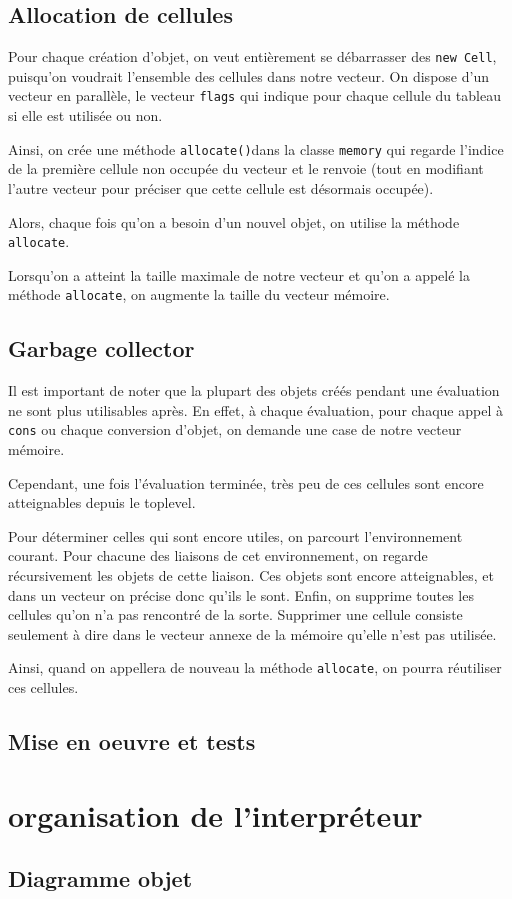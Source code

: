 \documentclass[12pt]{article}
\def\code #1{\lstinline{#1}}
\begin{document}
\subsection{Allocation de cellules}

Pour chaque création d'objet, on veut entièrement se débarrasser des \code{new Cell}, puisqu'on voudrait l'ensemble des cellules dans notre vecteur.  On dispose  d'un vecteur en parallèle, le vecteur \code{flags} qui indique pour chaque cellule du tableau si elle est utilisée ou non.

Ainsi, on crée une méthode \code{allocate()}dans la classe \code{memory} qui regarde l'indice de la première cellule non occupée du vecteur et le renvoie (tout en modifiant l'autre vecteur pour préciser que cette cellule est désormais occupée).

Alors, chaque fois qu'on a besoin d'un nouvel objet, on utilise la méthode \code{allocate}.

Lorsqu'on a atteint la taille maximale de notre vecteur et qu'on a appelé la méthode \code{allocate}, on augmente la taille du vecteur mémoire.

\subsection{Garbage collector}

Il est important de noter que la plupart des objets créés pendant une évaluation ne sont plus utilisables après. En effet, à chaque évaluation, pour chaque appel à \code{cons} ou chaque conversion d'objet, on demande une case de notre vecteur mémoire.

Cependant, une fois l'évaluation terminée, très peu de ces cellules sont encore atteignables depuis le toplevel.

Pour déterminer celles qui sont encore utiles, on parcourt l'environnement courant. Pour chacune des liaisons de cet environnement, on regarde récursivement les objets de cette liaison. Ces objets sont encore atteignables, et dans un vecteur on précise donc qu'ils le sont. Enfin, on supprime toutes les cellules qu'on n'a pas rencontré de la sorte. Supprimer une cellule consiste seulement à dire dans le vecteur annexe de la mémoire qu'elle n'est pas utilisée.

Ainsi, quand on appellera de nouveau la méthode \code{allocate}, on pourra réutiliser ces cellules.


\subsection{Mise en oeuvre et tests}

\section{organisation de l'interpréteur}

\subsection{Diagramme objet}
\end{document}
